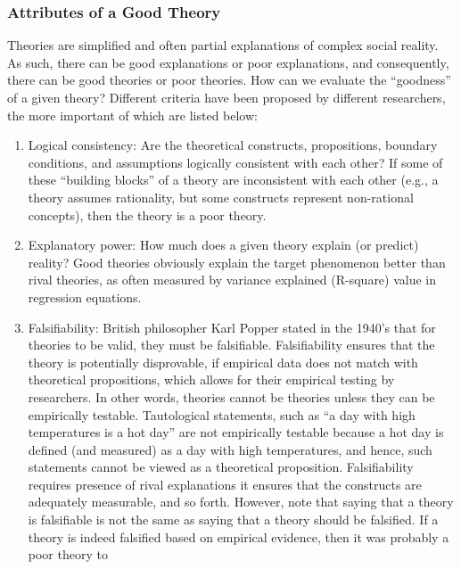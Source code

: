 \documentclass[]{book}
\theoremstyle{definition}
\theoremstyle{definition}
\theoremstyle{definition}
\theoremstyle{remark}
\begin{document}
\hypertarget{attributes-of-a-good-theory}{%
\subsubsection{Attributes of a Good
Theory}\label{attributes-of-a-good-theory}}

Theories are simplified and often partial explanations of complex social
reality. As such, there can be good explanations or poor explanations,
and consequently, there can be good theories or poor theories. How can
we evaluate the ``goodness'' of a given theory? Different criteria have
been proposed by different researchers, the more important of which are
listed below:

\begin{enumerate}
\def\labelenumi{\arabic{enumi}.}
\item
  Logical consistency: Are the theoretical constructs, propositions,
  boundary conditions, and assumptions logically consistent with each
  other? If some of these ``building blocks'' of a theory are
  inconsistent with each other (e.g., a theory assumes rationality, but
  some constructs represent non-rational concepts), then the theory is a
  poor theory.
\item
  Explanatory power: How much does a given theory explain (or predict)
  reality? Good theories obviously explain the target phenomenon better
  than rival theories, as often measured by variance explained
  (R-square) value in regression equations.
\item
  Falsifiability: British philosopher Karl Popper stated in the 1940's
  that for theories to be valid, they must be falsifiable.
  Falsifiability ensures that the theory is potentially disprovable, if
  empirical data does not match with theoretical propositions, which
  allows for their empirical testing by researchers. In other words,
  theories cannot be theories unless they can be empirically testable.
  Tautological statements, such as ``a day with high temperatures is a
  hot day'' are not empirically testable because a hot day is defined
  (and measured) as a day with high temperatures, and hence, such
  statements cannot be viewed as a theoretical proposition.
  Falsifiability requires presence of rival explanations it ensures that
  the constructs are adequately measurable, and so forth. However, note
  that saying that a theory is falsifiable is not the same as saying
  that a theory should be falsified. If a theory is indeed falsified
  based on empirical evidence, then it was probably a poor theory to

\end{enumerate}
\end{document}
